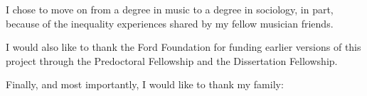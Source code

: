 {   I chose to move on from a degree in music to a degree in sociology, in part, because of the inequality experiences shared by my fellow musician friends. %
   
  
  I would also like to thank the Ford Foundation for funding earlier versions of this project through the Predoctoral Fellowship and the Dissertation Fellowship. 
  
  Finally, and most importantly, I would like to thank my family: 
  
}



